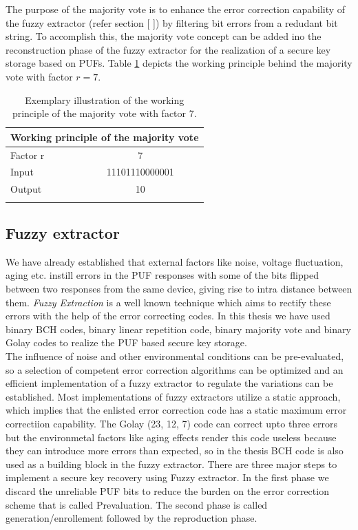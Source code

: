 The purpose of the majority vote is to enhance the error correction capability of the fuzzy extractor (refer section [ ]) by filtering bit errors from a redudant bit string. To accomplish this, the majority vote concept can be added ino the reconstruction phase of the fuzzy extractor for the realization of a secure key storage based on PUFs. Table \ref{mv} depicts the working principle behind the majority vote with factor $r = 7$.

\begin{table}[!ht]
\begin{center}
\begin{tabular}{lc}
\toprule
\multicolumn{2}{c}{\textbf{Working principle of the majority vote}}\\
\midrule
Factor r & 7 \\
Input & 11101110000001\\
Output & 10\\
\addlinespace
\bottomrule
\end{tabular}
\end{center}
\caption{Exemplary illustration of the working principle of the majority vote with factor 7.}
\label{mv}
\end{table}

\subsection{Fuzzy extractor}
\label{fuzzy_section}
We have already established that external factors like noise, voltage fluctuation, aging etc. instill errors in the PUF responses with some of the bits flipped between two responses from the same device, giving rise to intra distance between them. \emph{Fuzzy Extraction} is a well known technique which aims to rectify these errors with the help of the error correcting codes. In this thesis we have used binary BCH codes, binary linear repetition code, binary majority vote and binary Golay
codes to realize the PUF based secure key storage.\\

The influence of noise and other environmental conditions can be pre-evaluated, so a selection of competent error correction algorithms can be optimized and an efficient implementation of a fuzzy extractor to regulate the variations can be established. Most implementations of fuzzy extractors utilize a static approach, which implies that the enlisted error correction code has a static maximum error
correctiion capability. The Golay (23, 12, 7) code can correct upto three errors but the environmetal factors like aging effects render this code useless because they can introduce more errors than expected, so in the thesis BCH code is also used as a building block in the fuzzy extractor. There are three major steps to implement a secure key recovery using Fuzzy extractor. In the first phase we discard the unreliable PUF bits to reduce the burden on the error correction scheme that is called
Prevaluation. The second phase is called generation/enrollement followed by the reproduction phase.\\

